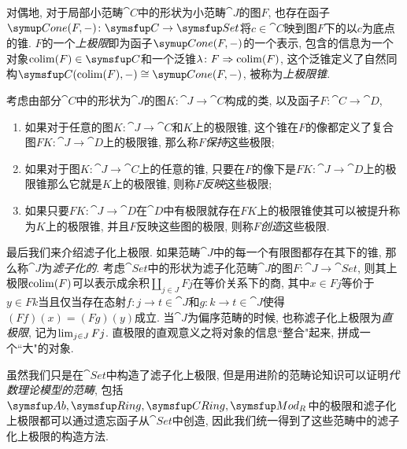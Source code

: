 对偶地, 对于局部小范畴$\cat{C}$中的形状为小范畴$\cat{J}$的图$F$, 也存在函子$\Cone(F, -)\colon \cat{C}\to\cat{Set}$将$c\in \cat{C}$映到图$F$下的以$c$为底点的锥. $F$的一个\emph{上极限}即为函子$\Cone (F, -)$的一个表示, 包含的信息为一个对象$\colim (F)\in \cat{C}$和一个泛锥$\lambda\colon F\Rightarrow \operatorname{colim} (F)$, 这个泛锥定义了自然同构$\cat{C}(\colim (F), -)\cong \Cone (F, -)$, 被称为\emph{上极限锥}.


考虑由部分$\cat{C}$中的形状为$\cat{J}$的图$K\colon \cat{J}\to\cat{C}$构成的类, 以及函子$F\colon \cat{C}\to\cat{D}$,
\begin{enumerate}
  \item 如果对于任意的图$K\colon\cat{J}\to\cat{C}$和$K$上的极限锥, 这个锥在$F$的像都定义了复合图$FK\colon \cat{J}\to\cat{D}$上的极限锥, 那么称$F$\emph{保持}这些极限;
  \item 如果对于图$K\colon\cat{J}\to\cat{C}$上的任意的锥, 只要在$F$的像下是$FK\colon \cat{J}\to\cat{D}$上的极限锥那么它就是$K$上的极限锥, 则称$F$\emph{反映}这些极限;
  \item 如果只要$FK\colon \cat{J}\to\cat{D}$在$\cat{D}$中有极限就存在$FK$上的极限锥使其可以被提升称为$K$上的极限锥, 并且$F$反映这些图的极限, 则称$F$\emph{创造}这些极限.
\end{enumerate}

最后我们来介绍滤子化上极限. 如果范畴$\cat{J}$中的每一个有限图都存在其下的锥, 那么称$\cat{J}$为\emph{滤子化的}. 考虑$\cat{Set}$中的形状为滤子化范畴$\cat{J}$的图$F\colon \cat{J}\to\cat{Set}$, 则其上极限$\operatorname{colim} (F)$可以表示成余积$\amalg_{j\in J}Fj$在等价关系下的商, 其中$x\in Fj$等价于$y\in Fk$当且仅当存在态射$f\colon j\to t\in\cat{J}$和$g\colon k\to t\in \cat{J}$使得$(Ff)(x)=(Fg)(y)$成立. 当$\cat{J}$为偏序范畴的时候, 也称滤子化上极限为\emph{直极限}, 记为$\operatorname{lim}_{j\in J}Fj$. 直极限的直观意义之将对象的信息``整合"起来, 拼成一个``大"的对象.

虽然我们只是在$\cat{Set}$中构造了滤子化上极限, 但是用进阶的范畴论知识可以证明\emph{代数理论模型的范畴}, 包括$\cat{Ab}, \linebreak[0]\cat{Ring}, \linebreak[0]\cat{CRing}, \linebreak[0]\cat{Mod}_R$中的极限和滤子化上极限都可以通过遗忘函子从$\cat{Set}$中创造\parencite[180; 181, Theorem 5.6.5]{riehl_category_2017}, 因此我们统一得到了这些范畴中的滤子化上极限的构造方法.

